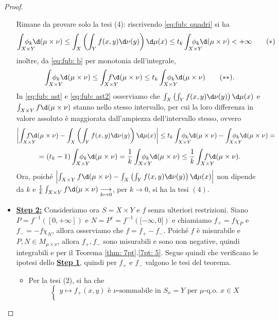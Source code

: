 \begin{proof}
\begin{itemize}
        Rimane da provare solo la tesi (4): riscrivendo \eqref{eq:fub: quadri} si ha 
        \[\int_{X\times Y}\!\!\!\!\!\!\!\!\!\!\phi_k\d(\mu\times \nu) 
        \leq \int_X\left(\int_Yf(x,y)\d\nu(y)\right)\d\mu(x)
        \leq t_k\int_{X\times Y}\!\!\!\!\!\!\!\!\!\!\phi_k\d(\mu\times \nu)<+\infty\tag{$\ast$}\label{eq:fub: ast}\]
        inoltre, da \eqref{eq:fub: b} per monotonia dell'integrale,
        \[\int_{X\times Y}\!\!\!\!\!\!\!\!\!\!\phi_k\d(\mu\times \nu) \leq
         \int_{X\times Y}\!\!\!\!\!\!\!\!\!\!f\d(\mu\times \nu) 
         \leq t_k\int_{X\times Y}\!\!\!\!\!\!\!\!\!\!\phi_k\d(\mu\times \nu)\tag{$\ast\ast$}\label{eq:fub: ast2}. \]
        In \eqref{eq:fub: ast} e \eqref{eq:fub: ast2} osserviamo che $\int_X\left(\int_Yf(x,y)\d\nu(y)\right)\d\mu(x)$ e $\int_{X\times Y}f\d(\mu\times \nu)$ stanno nello stesso intervallo, per cui la loro differenza in valore assoluto è maggiorata dall'ampiezza dell'intervallo stesso, ovvero
        \[\left|\int_{X\times Y}\!\!\!\!\!\!\!\!\!\!f\d(\mu\times \nu)-\int_X\left(\int_Yf(x,y)\d\nu(y)\right)\d\mu(x)\right|\leq t_k\int_{X\times Y}\!\!\!\!\!\!\!\!\!\!\phi_k\d(\mu\times \nu)-\int_{X\times Y}\!\!\!\!\!\!\!\!\!\!\phi_k\d(\mu\times \nu) = \]
        \[=(t_k-1)\int_{X\times Y}\!\!\!\!\!\!\!\!\!\!\phi_k\d(\mu\times \nu) = \frac{1}{k}\int_{X\times Y}\!\!\!\!\!\!\!\!\!\!\phi_k\d(\mu\times \nu) \leq \frac{1}{k}\int_{X\times Y}\!\!\!\!\!\!\!\!\!\!f\d(\mu\times \nu).\]
        Ora, poiché $\left|\int_{X\times Y}f\d(\mu\times \nu)-\int_X\left(\int_Yf(x,y)\d\nu(y)\right)\d\mu(x)\right|$ non dipende da $k$ e $\frac{1}{k}\int_{X\times Y}f\d(\mu\times \nu)\underset{k\mapsto 0}\longrightarrow$, per $k\to 0$, si ha la tesi $(4)$.
        \item \textbf{\underline{Step 2:}} Consideriamo ora $S=X\times Y$ e $f$ senza ulteriori restrizioni. Siano $P=f^{-1}([0,+\infty])$ e $N=P^{c}=f^{-1}([-\infty,0[)$ e chiamiamo $f_+=f\chi_P$ e $f_-=-f\chi_{N}$, allora osserviamo che $f=f_+-f_-$. Poiché $f$ è misurabile e $P,N\in M_{\mu\times\nu}$, allora $f_+,f_-$ sono misurabili e sono non negative, quindi integrabili e per il Teorema \ref{thm: 7pt}.\ref{7pt: 5}. Segue quindi che verificano le ipotesi dello \textbf{\underline{Step 1}}, quindi per $f_+$ e $f_-$ valgono le tesi del teorema. 
        \begin{itemize}
            \item Per la tesi (2), si ha che 
            \[\begin{cases}
                y\mapsto f_{+}(x,y) \text{ è $\nu$-sommabile in $S_x=Y$ per $\mu$-q.o. $x\in X$} \\

\end{cases}\]
\end{itemize}
\end{itemize}
\end{proof}
